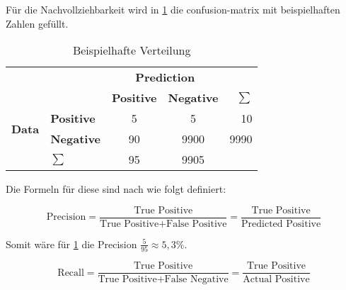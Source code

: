 Für die Nachvollziehbarkeit wird in \cref{tbl:exampledistribution} die \gls{confusion-matrix} mit beispielhaften Zahlen gefüllt.
\begin{table}[H]
	\begin{center}
		\begin{tabularx}{0.5\textwidth}{l l | c c | r}
			                               &                   & \multicolumn{2}{c|}{\textbf{Prediction}} &                            \\
			                               &                   & \textbf{Positive}                        & \textbf{Negative} & $\sum$ \\
			\cline{1-5}
			\multirow{2}{*}{\textbf{Data}} & \textbf{Positive} & 5                                        & 5                 & 10     \\
			                               & \textbf{Negative} & 90                                       & 9900              & 9990   \\
			\cline{1-5}
			                               & $\sum$            & 95                                       & 9905              &
		\end{tabularx}
	\end{center}
	\caption{Beispielhafte Verteilung}
	\label{tbl:exampledistribution}
\end{table}

Die Formeln für diese sind nach \citeauthor{towardsdatascience:stats}
wie folgt \autocite{towardsdatascience:stats} definiert:

\begin{defn}
	\begin{equation}
		\label{eqn:precision}
		\text{Precision}
		= \frac{\text{True Positive}}{\text{True Positive}+\text{False Positive}}
		= \frac{\text{True Positive}}{\text{Predicted Positive}}
	\end{equation}
\end{defn}

Somit wäre für \cref{tbl:exampledistribution}
die Precision
\(\frac{5}{95} \approx 5,3\% \).

\begin{defn}
	\begin{equation}
		\label{eqn:recall}
		\text{Recall}
		= \frac{\text{True Positive}}{\text{True Positive}+\text{False Negative}}
		= \frac{\text{True Positive}}{\text{Actual Positive}}
	\end{equation}
\end{defn}

